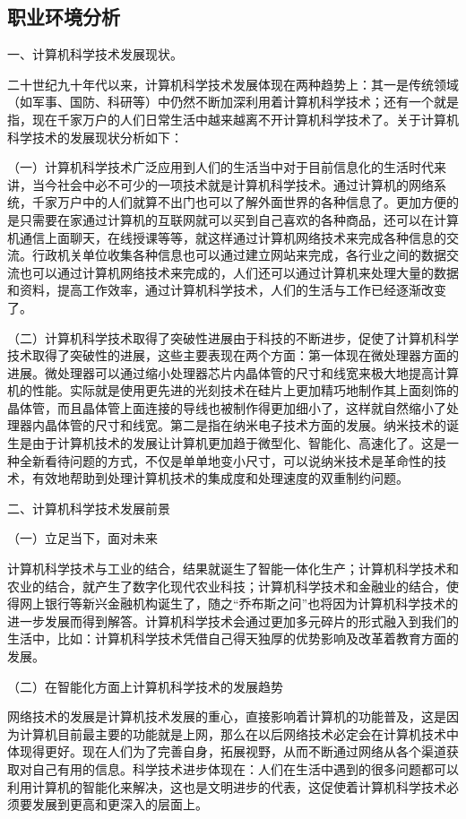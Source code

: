 \documentclass{article}
\begin{document}
\subsection{职业环境分析}
一、计算机科学技术发展现状。\par
二十世纪九十年代以来，计算机科学技术发展体现在两种趋势上：其一是传统领域（如军事、国防、科研等）中仍然不断加深利用着计算机科学技术；还有一个就是指，现在千家万户的人们日常生活中越来越离不开计算机科学技术了。关于计算机科学技术的发展现状分析如下：\par
（一）计算机科学技术广泛应用到人们的生活当中对于目前信息化的生活时代来讲，当今社会中必不可少的一项技术就是计算机科学技术。通过计算机的网络系统，千家万户中的人们就算不出门也可以了解外面世界的各种信息了。更加方便的是只需要在家通过计算机的互联网就可以买到自己喜欢的各种商品，还可以在计算机通信上面聊天，在线授课等等，就这样通过计算机网络技术来完成各种信息的交流。行政机关单位收集各种信息也可以通过建立网站来完成，各行业之间的数据交流也可以通过计算机网络技术来完成的，人们还可以通过计算机来处理大量的数据和资料，提高工作效率，通过计算机科学技术，人们的生活与工作已经逐渐改变了。\par
（二）计算机科学技术取得了突破性进展由于科技的不断进步，促使了计算机科学技术取得了突破性的进展，这些主要表现在两个方面：第一体现在微处理器方面的进展。微处理器可以通过缩小处理器芯片内晶体管的尺寸和线宽来极大地提高计算机的性能。实际就是使用更先进的光刻技术在硅片上更加精巧地制作其上面刻饰的晶体管，而且晶体管上面连接的导线也被制作得更加细小了，这样就自然缩小了处理器内晶体管的尺寸和线宽。第二是指在纳米电子技术方面的发展。纳米技术的诞生是由于计算机技术的发展让计算机更加趋于微型化、智能化、高速化了。这是一种全新看待问题的方式，不仅是单单地变小尺寸，可以说纳米技术是革命性的技术，有效地帮助到处理计算机技术的集成度和处理速度的双重制约问题。\par
二、计算机科学技术发展前景\par
（一）立足当下，面对未来\par
计算机科学技术与工业的结合，结果就诞生了智能一体化生产；计算机科学技术和农业的结合，就产生了数字化现代农业科技；计算机科学技术和金融业的结合，使得网上银行等新兴金融机构诞生了，随之“乔布斯之问”也将因为计算机科学技术的进一步发展而得到解答。计算机科学技术会通过更加多元碎片的形式融入到我们的生活中，比如：计算机科学技术凭借自己得天独厚的优势影响及改革着教育方面的发展。\par
（二）在智能化方面上计算机科学技术的发展趋势\par
网络技术的发展是计算机技术发展的重心，直接影响着计算机的功能普及，这是因为计算机目前最主要的功能就是上网，那么在以后网络技术必定会在计算机技术中体现得更好。现在人们为了完善自身，拓展视野，从而不断通过网络从各个渠道获取对自己有用的信息。科学技术进步体现在：人们在生活中遇到的很多问题都可以利用计算机的智能化来解决，这也是文明进步的代表，这促使着计算机科学技术必须要发展到更高和更深入的层面上。\par
\end{document}
